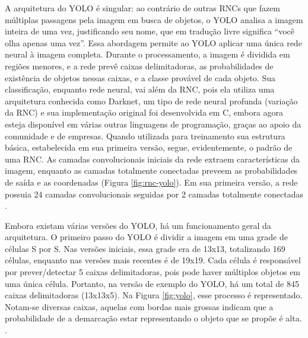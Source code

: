 A arquitetura do YOLO é singular: ao contrário de outras RNCs que fazem múltiplas passagens pela imagem em busca de objetos, o YOLO analisa a imagem inteira de uma vez, justificando seu nome, que em tradução livre significa “você olha apenas uma vez”. Essa abordagem permite ao YOLO aplicar uma única rede neural à imagem completa. Durante o processamento, a imagem é dividida em regiões menores, e a rede prevê caixas delimitadoras, as probabilidades de existência de objetos nessas caixas, e a classe provável de cada objeto. Sua classificação, enquanto rede neural, vai além da RNC, pois ela utiliza uma arquitetura conhecida como Darknet, um tipo de rede neural profunda (variação da RNC) e sua implementação original foi desenvolvida em C, embora agora esteja disponível em várias outras linguagens de programação, graças ao apoio da comunidade e de empresas. Quando utilizada para treinamento sua estrutura básica, estabelecida em sua primeira versão, segue, evidentemente, o padrão de uma RNC. As camadas convolucionais iniciais da rede extraem características da imagem, enquanto as camadas totalmente conectadas preveem as probabilidades de saída e as coordenadas (Figura \ref{fig:rnc-yolo}). Em sua primeira versão, a rede possuia 24 camadas convolucionais seguidas por 2 camadas totalmente conectadas \cite{yoloVisaoComputacional}.

Embora existam várias versões do YOLO, há um funcionamento geral da arquitetura. O primeiro passo do YOLO é dividir a imagem em uma grade de células S por S. Nas versões iniciais, essa grade era de 13x13, totalizando 169 células, enquanto nas versões mais recentes é de 19x19. Cada célula é responsável por prever/detectar 5 caixas delimitadoras, pois pode haver múltiplos objetos em uma única célula. Portanto, na versão de exemplo do YOLO, há um total de 845 caixas delimitadoras (13x13x5). Na Figura \ref{fig:yolo}, esse processo é representado. Notam-se diversas caixas, aquelas com bordas mais grossas indicam que a probabilidade de a demarcação estar representando o objeto que se propõe é alta. \cite{jiang2022review}.

